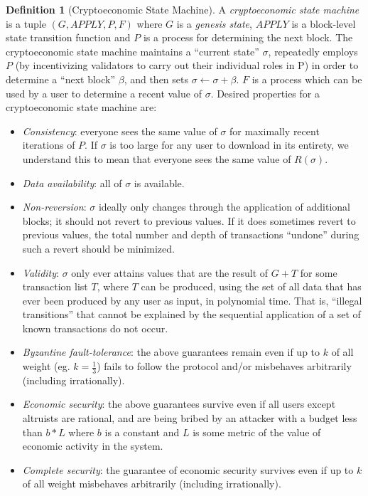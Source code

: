 \documentclass[11pt,a4paper]{report}
\theoremstyle{plain}
\theoremstyle{definition}
\newtheorem{defn}{Definition}[chapter]
\theoremstyle{remark}
\begin{document}
\begin{defn}[Cryptoeconomic State Machine]
A \emph{cryptoeconomic state machine} is a tuple $(G, APPLY, P, F)$ where $G$ is a \emph{genesis state}, $APPLY$ is a block-level state transition function and $P$ is a process for determining the next block. The cryptoeconomic state machine maintains a ``current state'' $\sigma$, repeatedly employs $P$ (by incentivizing validators to carry out their individual roles in P) in order to determine a ``next block'' $\beta$, and then sets $\sigma \leftarrow \sigma + \beta$. $F$ is a process which can be used by a user to determine a recent value of $\sigma$. Desired properties for a cryptoeconomic state machine are:

\begin{itemize}
\item
\emph{Consistency}: everyone sees the same value of $\sigma$ for maximally recent iterations of $P$. If $\sigma$ is too large for any user to download in its entirety, we understand this to mean that everyone sees the same value of $R(\sigma)$.
\item
\emph{Data availability}: all of $\sigma$ is available.
\item
\emph{Non-reversion}: $\sigma$ ideally only changes through the application of additional blocks; it should not revert to previous values. If it does sometimes revert to previous values, the total number and depth of transactions ``undone'' during such a revert should be minimized.
\item
\emph{Validity}: $\sigma$ only ever attains values that are the result of $G + T$ for some transaction list $T$, where $T$ can be produced, using the set of all data that has ever been produced by any user as input, in polynomial time. That is, ``illegal transitions'' that cannot be explained by the sequential application of a set of known transactions do not occur.
\item
\emph{Byzantine fault-tolerance}: the above guarantees remain even if up to $k$ of all weight (eg. $k = \frac{1}{3}$) fails to follow the protocol and/or misbehaves arbitrarily (including irrationally).
\item
\emph{Economic security}: the above guarantees survive even if all users except altruists are rational, and are being bribed by an attacker with a budget less than $b * L$ where $b$ is a constant and $L$ is some metric of the value of economic activity in the system.
\item
\emph{Complete security}: the guarantee of economic security survives even if up to $k$ of all weight misbehaves arbitrarily (including irrationally).
\end{itemize}
\end{defn}
\end{document}
